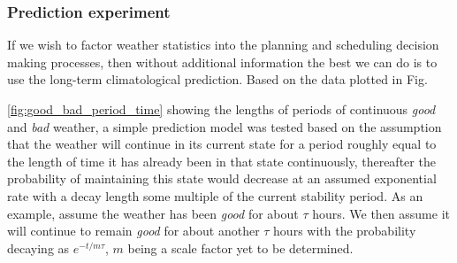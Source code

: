 \subsubsection{Prediction experiment}
\label{ss:conc_pred}
If we wish to factor weather statistics into the planning and scheduling decision making processes, then without additional information the best we can do is to use the long-term climatological prediction. Based on the data plotted in Fig. {\ref{fig:good_bad_period_time} showing the lengths of periods of continuous \emph{good} and \emph{bad} weather, a simple prediction model was tested based on the assumption that the weather will continue in its current state for a period roughly equal to the length of time it has already been in that state continuously, thereafter the probability of maintaining this state would decrease at an assumed exponential rate with a decay length some multiple of the current stability period. As an example, assume the weather has been \emph{good} for about $\tau$ hours. We then assume it will continue to remain \emph{good} for about another $\tau$ hours with the probability decaying as $e^{-t/m\tau}$, $m$ being a scale factor yet to be determined.

}

